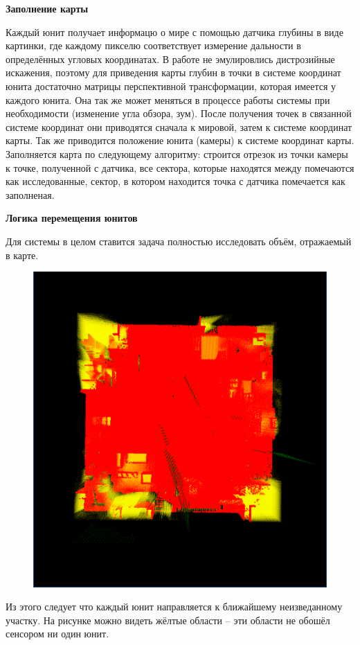 \begin{slide}

    \makeatletter
    \let\@topfil\relax
    \makeatother

    \textbf{Заполнение карты}

    Каждый юнит получает информацю о мире с помощью датчика глубины в виде картинки,
    где каждому пикселю соответствует измерение дальности в определённых угловых координатах. В работе не эмулировлись
    дистрозийные искажения, поэтому для приведения карты глубин в точки в системе координат юнита достаточно 
    матрицы перспективной трансформации, которая имеется у каждого юнита. Она так же может меняться в процессе работы
    системы при необходимости (изменение угла обзора, зум). После получения точек в связанной системе координат они приводятся
    сначала к мировой, затем к системе координат карты. Так же приводится положение юнита (камеры) к системе координат карты.
    Заполняется карта по следующему алгоритму: строится отрезок из точки камеры к точке, полученной с датчика, все сектора, которые
    находятся между помечаются как исследованные, сектор, в котором находится точка с датчика помечается как заполненая.

\end{slide}

\begin{slide}

    \makeatletter
    \let\@topfil\relax
    \makeatother

    \textbf{Логика перемещения юнитов}

    Для системы в целом ставится задача полностью исследовать объём, отражаемый в карте.
    \begin{figure}
        \begin{center}
       \includegraphics[width=0.8\linewidth]{pic1.png}
        \end{center}
    \end{figure}
    Из этого следует что каждый юнит направляется к ближайшему неизведанному участку. 
    На рисунке можно видеть жёлтые области -- эти области не обошёл сенсором ни один юнит.

\end{slide}

